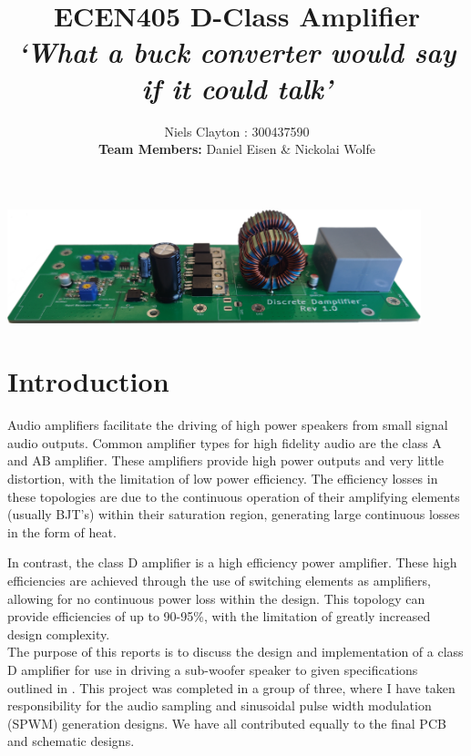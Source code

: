 \documentclass[a4paper,11pt]{article}
\begin{document}
\title{\LARGE{\textbf{ECEN405 D-Class Amplifier}}\\ \large{\textit{`What a buck converter would say if it could talk'}}}
\author{Niels Clayton : 300437590\\
\textbf{Team Members:} Daniel Eisen \& Nickolai Wolfe}
\date{}
\maketitle

\begin{center}
    \vspace{-20pt}
    \includegraphics[width=0.9\textwidth]{design.png}
\end{center}

\section{Introduction}\label{S:intro}

Audio amplifiers facilitate the driving of high power speakers from small signal audio outputs. Common amplifier types for high fidelity audio are the class A and AB amplifier. These amplifiers provide high power outputs and very little distortion, with the limitation of low power efficiency. The efficiency losses in these topologies are due to the continuous operation of their amplifying elements (usually BJT's) within their saturation region, generating large continuous losses in the form of heat.

In contrast, the class D amplifier is a high efficiency power amplifier. These high efficiencies are achieved through the use of switching elements as amplifiers, allowing for no continuous power loss within the design. This topology can provide efficiencies of up to 90-95\%, with the limitation of greatly increased design complexity.\\

The purpose of this reports is to discuss the design and implementation of a class D amplifier for use in driving a sub-woofer speaker to given specifications outlined in . This project was completed in a group of three, where I have taken responsibility for the audio sampling and sinusoidal pulse width modulation (SPWM) generation designs. We have all contributed equally to the final PCB and schematic designs. 
\end{document}
